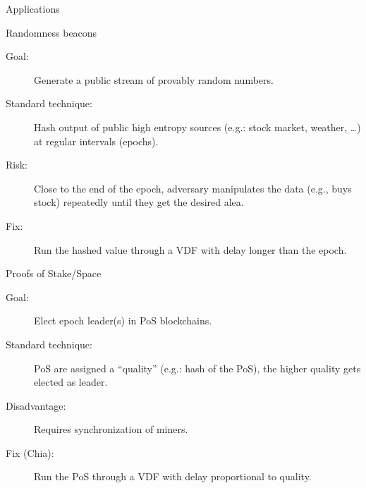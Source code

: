 \documentclass[aspectratio=169]{beamer}
\begin{document}

\begin{frame}{Applications}
  \begin{block}{Randomness beacons}
    \begin{description}
    \item[Goal:] Generate a public stream of provably random numbers.
    \item[Standard technique:] Hash output of public high entropy
      sources (e.g.: stock market, weather, \dots) at regular
      intervals (epochs).
    \item[Risk:] Close to the end of the epoch, adversary manipulates
      the data (e.g., buys stock) repeatedly until they get the
      desired alea.
    \item[Fix:] Run the hashed value through a VDF with delay longer
      than the epoch.
    \end{description}
  \end{block}

  \begin{block}{Proofs of Stake/Space}
    \begin{description}
    \item[Goal:] Elect epoch leader(s) in PoS blockchains.
    \item[Standard technique:] PoS are assigned a ``quality'' (e.g.:
      hash of the PoS), the higher quality gets elected as leader.
    \item[Disadvantage:] Requires synchronization of miners.
    \item[Fix (Chia):] Run the PoS through a VDF with delay
      proportional to quality.
    \end{description}
  \end{block}
\end{frame}

\end{document}
